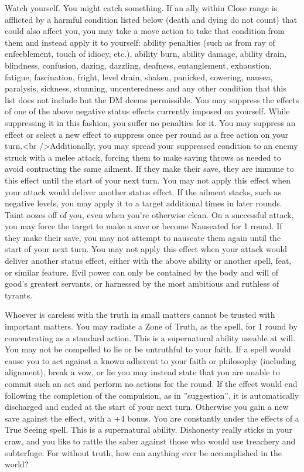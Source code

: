 \begin{optional}
{Watch yourself. You might catch something.}
{If an ally within Close range is afflicted by a harmful condition listed below (death and dying do not count) that could also affect you, you may take a move action to take that condition from them and instead apply it to yourself: ability penalties (such as from ray of enfeeblement, touch of idiocy, etc.), ability burn, ability damage, ability drain, blindness, confusion, dazing, dazzling, deafness, entanglement, exhaustion, fatigue, fascination, fright, level drain, shaken, panicked, cowering, nausea, paralysis, sickness, stunning, uncenteredness and any other condition that this list does not include but the DM deems permissible.}
{You may suppress the effects of one of the above negative status effects currently imposed on yourself. While suppressing it in this fashion, you suffer no penalties for it. You may suppress an effect or select a new effect to suppress once per round as a free action on your turn.<br />Additionally, you may spread your suppressed condition to an enemy struck with a melee attack, forcing them to make saving throws as needed to avoid contracting the same ailment. If they make their save, they are immune to this effect until the start of your next turn. You may not apply this effect when your attack would deliver another status effect. If the ailment stacks, such as negative levels, you may apply it to a target additional times in later rounds.}
{Taint oozes off of you, even when you're otherwise clean. On a successful attack, you may force the target to make a save or become Nauseated for 1 round. If they make their save, you may not attempt to nauseate them again until the start of your next turn. You may not apply this effect when your attack would deliver another status effect, either with the above ability or another spell, feat, or similar feature.}
{Evil power can only be contained by the body and will of good's greatest servants, or harnessed by the most ambitious and ruthless of tyrants.}

{Whoever is careless with the truth in small matters cannot be trusted with important matters.}
{You may radiate a Zone of Truth, as the spell, for 1 round by concentrating as a standard action. This is a supernatural ability useable at will.}
{You may not be compelled to lie or be untruthful to your faith. If a spell would cause you to act against a known adherent to your faith or philosophy (including alignment), break a vow, or lie you may instead state that you are unable to commit such an act and perform no actions for the round. If the effect would end following the completion of the compulsion, as in ''suggestion'', it is automatically discharged and ended at the start of your next turn. Otherwise you gain a new save against the effect, with a +4 bonus.}
{You are constantly under the effects of a True Seeing spell. This is a supernatural ability.}
{Dishonesty really sticks in your craw, and you like to rattle the saber against those who would use treachery and subterfuge. For without truth, how can anything ever be accomplished in the world?}


\end{optional}
